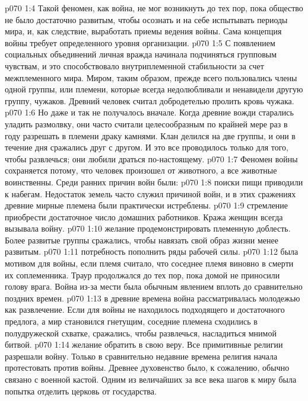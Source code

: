 \vs p070 1:4 Такой феномен, как война, не мог возникнуть до тех пор, пока общество не было достаточно развитым, чтобы осознать и на себе испытывать периоды мира, и, как следствие, выработать приемы ведения войны. Сама концепция войны требует определенного уровня организации.
\vs p070 1:5 С появлением социальных объединений личная вражда начинала подчиняться групповым чувствам, и это способствовало внутриплеменной стабильности за счет межплеменного мира. Миром, таким образом, прежде всего пользовались члены одной группы, или племени, которые всегда недолюбливали и ненавидели другую группу, чужаков. Древний человек считал добродетелью пролить кровь чужака.
\vs p070 1:6 Но даже и так не получалось вначале. Когда древние вожди старались уладить размолвку, они часто считали целесообразным по крайней мере раз в году разрешать в племени драку камнями. Клан делился на две группы, и они в течение дня сражались друг с другом. И это все проводилось только для того, чтобы развлечься; они любили драться по\hyp{}настоящему.
\vs p070 1:7 \pc Феномен войны сохраняется потому, что человек произошел от животного, а все животные воинственны. Среди ранних причин войн были:
\vs p070 1:8 \bibnobreakspace {} поиски пищи приводили к набегам. Недостаток земель часто служил причиной войн, и в этих сражениях древние мирные племена были практически истреблены.
\vs p070 1:9 \bibnobreakspace {} стремление приобрести достаточное число домашних работников. Кража женщин всегда вызывала войну.
\vs p070 1:10 \bibnobreakspace {} желание продемонстрировать племенную доблесть. Более развитые группы сражались, чтобы навязать свой образ жизни менее развитым.
\vs p070 1:11 \bibnobreakspace {} потребность пополнить ряды рабочей силы.
\vs p070 1:12 \bibnobreakspace {} была мотивом для войны, если племя считало, что соседнее племя виновно в смерти их соплеменника. Траур продолжался до тех пор, пока домой не приносили голову врага. Война из\hyp{}за мести была обычным явлением вплоть до сравнительно поздних времен.
\vs p070 1:13 \bibnobreakspace {} в древние времена война рассматривалась молодежью как развлечение. Если для войны не находилось подходящего и достаточного предлога, а мир становился гнетущим, соседние племена сходились в полудружеской схватке, сражались, чтобы развлечься, насладиться мнимой битвой.
\vs p070 1:14 \bibnobreakspace {} желание обратить в свою веру. Все примитивные религии разрешали войну. Только в сравнительно недавние времена религия начала протестовать против войны. Древнее духовенство было, к сожалению, обычно связано с военной кастой. Одним из величайших за все века шагов к миру была попытка отделить церковь от государства.
